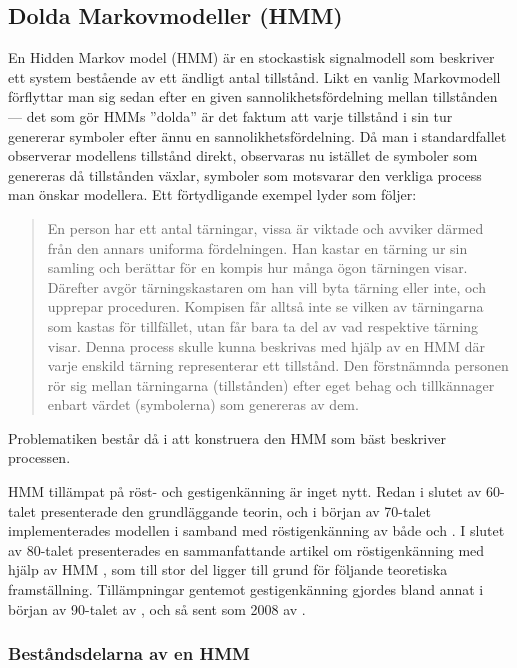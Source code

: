 \documentclass[../rapport_MVEX01-11-05]{subfiles}
\begin{document}
\subsection{Dolda Markovmodeller (HMM)}\label{sec:HMM}

En Hidden Markov model (HMM) är en stockastisk signalmodell som
beskriver ett system bestående av ett ändligt antal tillstånd. Likt en
vanlig Markovmodell förflyttar man sig sedan efter en given
sannolikhetsfördelning mellan tillstånden --- det som gör HMMs 
''dolda'' är det faktum att varje tillstånd i sin tur genererar
symboler efter ännu en sannolikhetsfördelning. Då man i standardfallet
observerar modellens tillstånd direkt, observaras nu istället de
symboler som genereras då tillstånden växlar, symboler som motsvarar
den verkliga process man önskar modellera. Ett förtydligande exempel
lyder som följer: 

\begin{quote}
En person har ett antal tärningar, vissa är viktade och avviker därmed
från den annars uniforma fördelningen. Han kastar en tärning ur sin
samling och berättar för en kompis hur många ögon tärningen
visar. Därefter avgör tärningskastaren om han vill byta tärning eller
inte, och upprepar proceduren. Kompisen får alltså inte se vilken av
tärningarna som kastas för tillfället, utan får bara ta del av vad
respektive tärning visar. Denna process skulle kunna beskrivas med
hjälp av en HMM där varje enskild tärning representerar ett
tillstånd. Den förstnämnda personen rör sig mellan tärningarna
(tillstånden) efter eget behag och tillkännager enbart värdet
(symbolerna) som genereras av dem. 
\end{quote}

Problematiken består då i att konstruera den HMM som bäst beskriver
processen.  

HMM tillämpat på röst- och gestigenkänning är inget nytt. Redan i
slutet av 60-talet presenterade  den
grundläggande teorin, och i början av 70-talet
implementerades modellen i samband med röstigenkänning av både
 och . I slutet av
80-talet presenterades en sammanfattande artikel om röstigenkänning
med hjälp av HMM \cite{Rabiner89}, som till stor del ligger till
grund för följande teoretiska framställning. Tillämpningar gentemot
gestigenkänning gjordes bland annat i början av 90-talet av ,
och så sent som 2008 av .

\subsubsection{Beståndsdelarna av en HMM}
\end{document}
